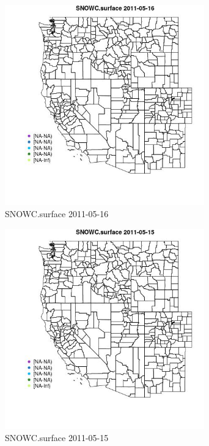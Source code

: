 \clearpage 

\begin{figure} 
\centering  
\includegraphics[width=0.77\textwidth]{Code_Outputs/ML_input_report_ML_input_PM25_Step5_part_d_de_duplicated_aves_ML_input_MapObsSNOWCsurface2011-05-16.jpg} 
\caption{\label{fig:ML_input_report_ML_input_PM25_Step5_part_d_de_duplicated_aves_ML_inputMapObsSNOWCsurface2011-05-16}SNOWC.surface 2011-05-16} 
\end{figure} 
 

\begin{figure} 
\centering  
\includegraphics[width=0.77\textwidth]{Code_Outputs/ML_input_report_ML_input_PM25_Step5_part_d_de_duplicated_aves_ML_input_MapObsSNOWCsurface2011-05-15.jpg} 
\caption{\label{fig:ML_input_report_ML_input_PM25_Step5_part_d_de_duplicated_aves_ML_inputMapObsSNOWCsurface2011-05-15}SNOWC.surface 2011-05-15} 
\end{figure} 
 

